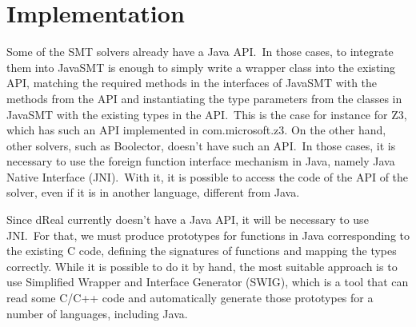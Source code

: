 \documentclass[a4paper,12pt]{article}
\begin{document}
\section{Implementation}

Some of the SMT solvers already have a Java API.\ In those cases, to integrate them into JavaSMT is enough to simply write a wrapper class into the existing API, matching the
required methods in the interfaces of JavaSMT with the methods from the API and instantiating the type parameters from the classes in JavaSMT with the existing types in the API.\ This is the case for instance for Z3, which has such an API implemented in com.microsoft.z3. On the other hand, other solvers, such as Boolector, doesn't have such an API.\ In those cases, it is necessary to use the foreign function interface mechanism in Java, namely Java Native Interface (JNI).\ With it, it is possible to access the code of the API of the solver, even if it is in another language, different from Java.

Since dReal currently doesn't have a Java API, it will be necessary to use JNI.\ For that, we must produce prototypes for functions in Java corresponding to the existing C code, defining the signatures of functions and mapping the types correctly. While it is possible to do it by hand, the most suitable approach is to use Simplified Wrapper and Interface Generator (SWIG), which is a tool that can read some C/C++ code and automatically generate those prototypes for a number of languages, including Java.
\end{document}
